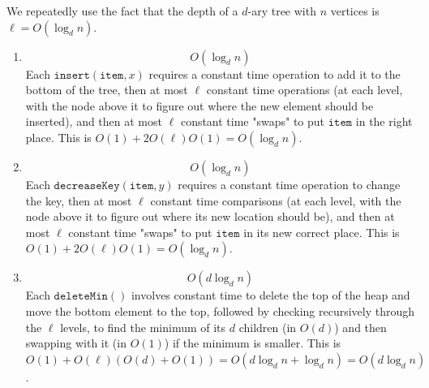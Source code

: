 \documentclass[12 pt, letterpaper]{hmcpset}
\begin{document}
\begin{solution}
	We repeatedly use the fact that the depth of a $d$-ary tree with $n$ vertices is $\ell = O(\log_{d} n)$.
	\begin{enumerate}
		\item 
			\[
				\boxed{
					O(\log_{d} n)
				}
			\]
			Each $\mathtt{insert}(\mathtt{item}, x)$ requires a constant time operation to add it to the bottom of the tree, then at most $\ell$ constant time operations (at each level, with the node above it to figure out where the new element should be inserted), and then at most $\ell$ constant time "swaps" to put $\mathtt{item}$ in the right place. This is $O(1) + 2 O(\ell) O(1) = O(\log_{d} n)$.

		\item
			\[
				\boxed{
					O(\log_{d} n)
				}
			\]
			Each $\mathtt{decreaseKey}(\mathtt{item}, y)$ requires a constant time operation to change the key, then at most $\ell$ constant time comparisons (at each level, with the node above it to figure out where its new location should be), and then at most $\ell$ constant time "swaps" to put $\mathtt{item}$ in its new correct place. This is $O(1) + 2 O(\ell) O(1) = O(\log_{d} n)$.

		\item
			\[
				\boxed{
					O(d \log_{d} n)
				}
			\]
			Each $\mathtt{deleteMin}()$ involves constant time to delete the top of the heap and move the bottom element to the top, followed by checking recursively through the $\ell$ levels, to find the minimum of its $d$ children (in $O(d)$) and then swapping with it (in $O(1)$) if the minimum is smaller. This is $O(1) + O(\ell)(O(d) + O(1)) = O(d \log_{d} n + \log_{d} n) = O(d \log_{d} n)$.
	\end{enumerate}
\end{solution}

\pagebreak
\end{document}
